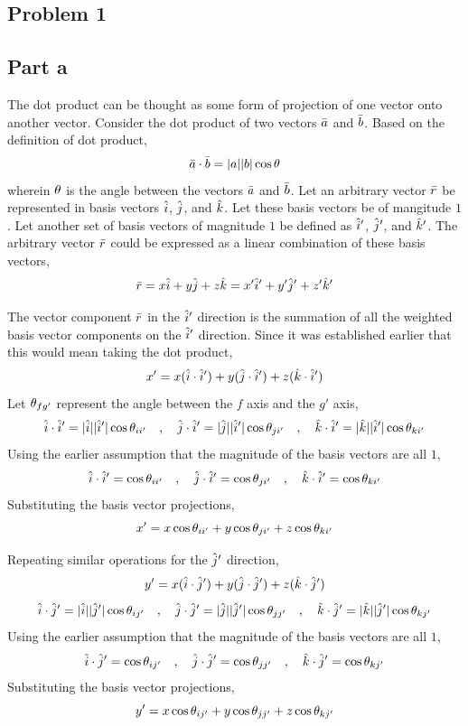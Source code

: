 \documentclass[class=report, 12pt, crop=false]{standalone}
\begin{document}
\begin{center}
\section{Problem 1}

\subsection{Part a}
The dot product can be thought as some form of projection of one vector onto another vector. Consider the dot product of two vectors $\bar{a}$ and $\bar{b}$. Based on the definition of dot product,
$$\bar{a}\cdot\bar{b} = |a||b|\cos\theta$$
wherein $\theta$ is the angle between the vectors $\bar{a}$ and $\bar{b}$. Let an arbitrary vector $\bar{r}$ be represented in basis vectors $\hat{i}$, $\hat{j}$, and $\hat{k}$. Let these basis vectors be of mangitude $1$. Let another set of basis vectors of magnitude $1$ be defined as $\hat{i}'$, $\hat{j}'$, and $\hat{k}'$. The arbitrary vector $\bar{r}$ could be expressed as a linear combination of these basis vectors,
$$\bar{r} = x\hat{i} + y\hat{j} + z\hat{k} = x'\hat{i}' + y'\hat{j}' + z'\hat{k}'$$

The vector component $\bar{r}$ in the $\hat{i}'$ direction is the summation of all the weighted basis vector components on the $\hat{i}'$ direction. Since it was established earlier that this would mean taking the dot product,
$$x' = x(\hat{i}\cdot\hat{i}') + y(\hat{j}\cdot\hat{i}') + z(\hat{k}\cdot\hat{i}')$$
Let $\theta_{fg'}$ represent the angle between the $f$ axis and the $g'$ axis,
$$\hat{i}\cdot\hat{i}' = |\hat{i}||\hat{i}'|\cos\theta_{ii'} \quad,\quad \hat{j}\cdot\hat{i}' = |\hat{j}||\hat{i}'|\cos\theta_{ji'} \quad,\quad \hat{k}\cdot\hat{i}' = |\hat{k}||\hat{i}'|\cos\theta_{ki'}$$
Using the earlier assumption that the magnitude of the basis vectors are all $1$,
$$\hat{i}\cdot\hat{i}' = \cos\theta_{ii'} \quad,\quad \hat{j}\cdot\hat{i}' = \cos\theta_{ji'} \quad,\quad \hat{k}\cdot\hat{i}' = \cos\theta_{ki'}$$
Substituting the basis vector projections,
$$x' = x\cos\theta_{ii'} + y\cos\theta_{ji'} + z\cos\theta_{ki'}$$

Repeating similar operations for the $\hat{j}'$ direction,
$$y' = x(\hat{i}\cdot\hat{j}') + y(\hat{j}\cdot\hat{j}') + z(\hat{k}\cdot\hat{j}')$$
$$\hat{i}\cdot\hat{j}' = |\hat{i}||\hat{j}'|\cos\theta_{ij'} \quad,\quad \hat{j}\cdot\hat{j}' = |\hat{j}||\hat{j}'|\cos\theta_{jj'} \quad,\quad \hat{k}\cdot\hat{j}' = |\hat{k}||\hat{j}'|\cos\theta_{kj'}$$
Using the earlier assumption that the magnitude of the basis vectors are all $1$,
$$\hat{i}\cdot\hat{j}' = \cos\theta_{ij'} \quad,\quad \hat{j}\cdot\hat{j}' = \cos\theta_{jj'} \quad,\quad \hat{k}\cdot\hat{j}' = \cos\theta_{kj'}$$
Substituting the basis vector projections,
$$y' = x\cos\theta_{ij'} + y\cos\theta_{jj'} + z\cos\theta_{kj'}$$


\end{center}
\end{document}
